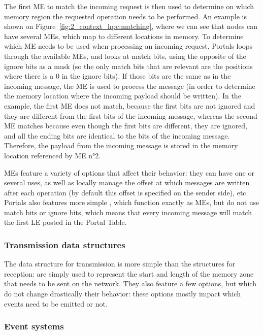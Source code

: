 The first ME to match the incoming request is then used to determine on which
memory region the requested operation needs to be performed. An example is shown
on Figure~\ref{fig:2_context_hpc:matching}, where we can see that nodes can have
several MEs, which map to different locations in memory. To determine which ME
needs to be used when processing an incoming request, Portals loops through the
available MEs, and looks at match bits, using the opposite of the ignore bits as
a mask (so the only match bits that are relevant are the positions where there
is a 0 in the ignore bits). If those bits are the same as in the incoming
message, the ME is used to process the message (in order to determine the memory
location where the incoming payload should be written). In the example, the
first ME does not match, because the first bits are not ignored and they are
different from the first bits of the incoming message, whereas the second ME
matches because even though the first bits are different, they are ignored, and
all the ending bits are identical to the bits of the incoming message.
Therefore, the payload from the incoming message is stored in the memory
location referenced by ME n°2.

MEs feature a variety of options that affect their behavior: they can have one
or several uses, as well as locally manage the offset at which messages are
written after each operation (by default this offset is specified on the sender
side), etc. Portals also features more simple ,
which function exactly as MEs, but do not use match bits or ignore bits, which
means that every incoming message will match the first LE posted in the Portal
Table.

\subsubsection{Transmission data structures}

The data structure for transmission is more simple than the structures for
reception:  are simply used to represent the
start and length of the memory zone that needs to be sent on the network. They
also feature a few options, but which do not change drastically their behavior:
these options mostly impact which events need to be emitted or not.

\subsubsection{Event systems}

